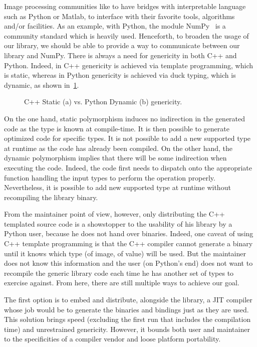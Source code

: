 Image processing communities like to have bridges with interpretable language such as Python or Matlab, to interface
with their favorite tools, algorithms and/or facilities. As an example, with Python, the module
NumPy~\parencite{harris.2020.numpy} is a community standard which is heavily used. Henceforth, to broaden the usage of
our library, we should be able to provide a way to communicate between our library and NumPy. There is always a need for
genericity in both C++ and Python. Indeed, in C++ genericity is achieved via template programming, which is static,
whereas in Python genericity is achieved via duck typing, which is dynamic, as shown
in~\cref{fig:static.vs.dynamic.genericity}.

\begin{figure}[htbp]
  \centering
  \hfil
  \caption{C++ Static (a) vs. Python Dynamic (b) genericity.}
  \label{fig:static.vs.dynamic.genericity}
\end{figure}

On the one hand, static polymorphism induces no indirection in the generated code as the type is known at compile-time.
It is then possible to generate optimized code for specific types. It is not possible to add a new supported type at
runtime as the code has already been compiled. On the other hand, the dynamic polymorphism implies that there will be
some indirection when executing the code. Indeed, the code first needs to dispatch onto the appropriate function
handling the input types to perform the operation properly. Nevertheless, it is possible to add new supported type at
runtime without recompiling the library binary.

From the maintainer point of view, however, only distributing the C++ templated source code is a showstopper to the
usability of his library by a Python user, because he does not hand over binaries. Indeed, one caveat of using C++
template programming is that the C++ compiler cannot generate a binary until it knows which type (of image, of value)
will be used. But the maintainer does not know this information and the user (on Python's end) does not want to
recompile the generic library code each time he has another set of types to exercise against. From here, there are still
multiple ways to achieve our goal.

The first option is to embed and distribute, alongside the library, a JIT compiler whose job would be to generate the
binaries and bindings just as they are used. This solution brings speed (excluding the first run that includes the
compilation time) and unrestrained genericity. However, it bounds both user and maintainer to the specificities of a
compiler vendor and loose platform portability.

